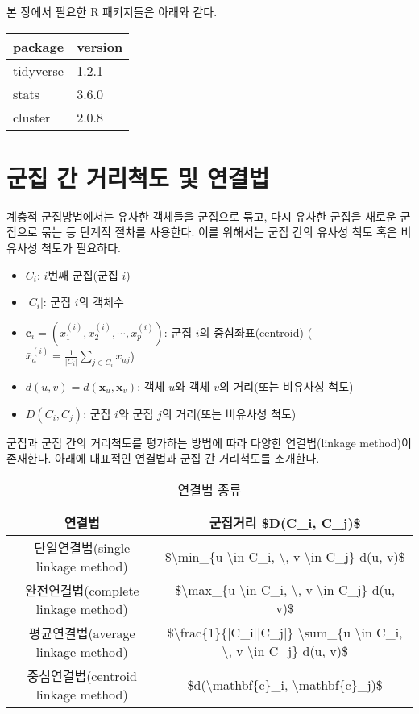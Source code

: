 \documentclass[]{book}
\providecommand{\tightlist}{%
  \setlength{\itemsep}{0pt}\setlength{\parskip}{0pt}}
\begin{document}
본 장에서 필요한 R 패키지들은 아래와 같다.

\begin{tabular}{l|l}
\hline
package & version\\
\hline
tidyverse & 1.2.1\\
\hline
stats & 3.6.0\\
\hline
cluster & 2.0.8\\
\hline
\end{tabular}

\hypertarget{distance-between-clusters}{%
\section{군집 간 거리척도 및 연결법}\label{distance-between-clusters}}

계층적 군집방법에서는 유사한 객체들을 군집으로 묶고, 다시 유사한 군집을 새로운 군집으로 묶는 등 단계적 절차를 사용한다. 이를 위해서는 군집 간의 유사성 척도 혹은 비유사성 척도가 필요하다.

\begin{itemize}
\tightlist
\item
  \(C_i\): \(i\)번째 군집(군집 \(i\))
\item
  \(|C_i|\): 군집 \(i\)의 객체수
\item
  \(\mathbf{c}_i = \left( \bar{x}_1^{(i)}, \bar{x}_2^{(i)}, \cdots, \bar{x}_p^{(i)} \right)\): 군집 \(i\)의 중심좌표(centroid) (\(\bar{x}_a^{(i)} = \frac{1}{|C_i|} \sum_{j \in C_i} x_{aj}\))
\item
  \(d(u, v) = d(\mathbf{x}_u, \mathbf{x}_v)\): 객체 \(u\)와 객체 \(v\)의 거리(또는 비유사성 척도)
\item
  \(D(C_i, C_j)\): 군집 \(i\)와 군집 \(j\)의 거리(또는 비유사성 척도)
\end{itemize}

군집과 군집 간의 거리척도를 평가하는 방법에 따라 다양한 연결법(linkage method)이 존재한다. 아래에 대표적인 연결법과 군집 간 거리척도를 소개한다.

\begin{table}[t]

\caption{\label{tab:linkage-method}연결법 종류}
\centering
\begin{tabular}{cc}
\toprule
연결법 & 군집거리 \$D(C\_i, C\_j)\$\\
\midrule
단일연결법(single linkage method) & \$\textbackslash{}min\_\{u \textbackslash{}in C\_i, \textbackslash{}, v \textbackslash{}in C\_j\} d(u, v)\$\\
완전연결법(complete linkage method) & \$\textbackslash{}max\_\{u \textbackslash{}in C\_i, \textbackslash{}, v \textbackslash{}in C\_j\} d(u, v)\$\\
평균연결법(average linkage method) & \$\textbackslash{}frac\{1\}\{|C\_i||C\_j|\} \textbackslash{}sum\_\{u \textbackslash{}in C\_i, \textbackslash{}, v \textbackslash{}in C\_j\} d(u, v)\$\\
중심연결법(centroid linkage method) & \$d(\textbackslash{}mathbf\{c\}\_i, \textbackslash{}mathbf\{c\}\_j)\$\\
\bottomrule
\end{tabular}
\end{table}
\end{document}
